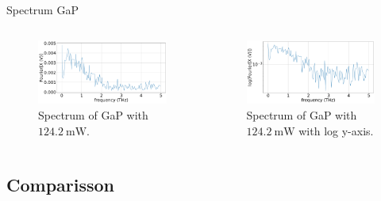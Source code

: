 \documentclass[aspectratio=1610, 9pt]{beamer}
\begin{document}
\begin{frame}{Spectrum GaP}
  \begin{columns}
    \begin{column}{.5\textwidth}
  \begin{figure}
    \includegraphics[width=\textwidth]{images/GaP14_55_42normalFX.pdf}
    \caption{\textcolor{tugreen}{Spectrum} of GaP with $\SI{124.2}{\milli\W}$.}
  \end{figure}
  \end{column}
  \begin{column}{.5\textwidth}
    \begin{figure}
      \includegraphics[width=\textwidth]{images/GaP14_55_42normallog(FX).pdf}
      \caption{\textcolor{tugreen}{Spectrum} of GaP with $\SI{124.2}{\milli\W}$ with log y-axis.}
    \end{figure}    
  \end{column}
  \end{columns}
\end{frame}

\subsection{Comparisson}
\end{document}
